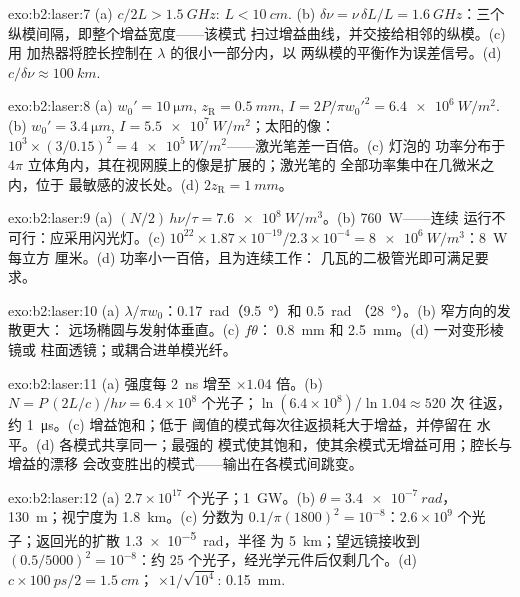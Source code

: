 \begin{solution}{exo:b2:laser:7}
(a) $c/2L > \qty{1.5}{GHz}$: $L < \qty{10}{cm}$. (b) $\delta\nu = \nu\,\delta L/L
= \qty{1.6}{GHz}$：三个纵模间隔，即整个增益宽度——该模式
扫过增益曲线，并交接给相邻的纵模。(c) 用
加热器将腔长控制在 $\lambda$ 的很小一部分内，以
两纵模的平衡作为误差信号。(d) $c/\delta\nu \approx
\qty{100}{km}$.
\end{solution}

\begin{solution}{exo:b2:laser:8}
(a) $w_0' = \qty{10}{\micro m}$, $z_{\text{R}} = \qty{0.5}{mm}$, $I = 2P/\pi
w_0'^2 = \qty{6.4e6}{W/m^2}$. (b) $w_0' = \qty{3.4}{\micro m}$, $I =
\qty{5.5e7}{W/m^2}$；太阳的像：$10^3 \times (3/0.15)^2 =
\qty{4e5}{W/m^2}$——激光笔差一百倍。(c) 灯泡的
功率分布于 $4\pi$ 立体角内，其在视网膜上的像是扩展的；激光笔的
全部功率集中在几微米之内，位于
最敏感的波长处。(d) $2z_{\text{R}} = \qty{1}{mm}$。
\end{solution}

\begin{solution}{exo:b2:laser:9}
(a) $(N/2)\,h\nu/\tau = \qty{7.6e8}{W/m^3}$。(b) \qty{760}{W}——连续
运行不可行：应采用闪光灯。(c) $10^{22} \times 1.87 \times
10^{-19}/2.3 \times 10^{-4} = \qty{8e6}{W/m^3}$：\qty{8}{W} 每立方
厘米。(d) 功率小一百倍，且为连续工作：
几瓦的二极管光即可满足要求。
\end{solution}

\begin{solution}{exo:b2:laser:10}
(a) $\lambda/\pi w_0$：\qty{0.17}{rad}（\qty{9.5}{\degree}）和 \qty{0.5}{rad}
（\qty{28}{\degree}）。(b) 窄方向的发散更大：
远场椭圆与发射体垂直。(c) $f\theta$：
\qty{0.8}{mm} 和 \qty{2.5}{mm}。(d) 一对变形棱镜或
柱面透镜；或耦合进单模光纤。
\end{solution}

\begin{solution}{exo:b2:laser:11}
(a) 强度每 \qty{2}{ns} 增至 $\times 1.04$ 倍。(b) $N = P\,(2L/c)/h\nu =
6.4 \times 10^8$ 个光子；$\ln(6.4 \times 10^8)/\ln 1.04 \approx 520$ 次
往返，约 \qty{1}{\micro s}。(c) 增益饱和；低于
阈值的模式每次往返损耗大于增益，并停留在
水平。(d) 各模式共享同一；最强的
模式使其饱和，使其余模式无增益可用；腔长与增益的漂移
会改变胜出的模式——输出在各模式间跳变。
\end{solution}

\begin{solution}{exo:b2:laser:12}
(a) $2.7 \times 10^{17}$ 个光子；\qty{1}{GW}。(b) $\theta = \qty{3.4e-7}{rad}$，
\qty{130}{m}；视宁度为 \qty{1.8}{km}。(c) 分数为 $0.1/\pi(1800)^2 =
10^{-8}$：$2.6 \times 10^9$ 个光子；返回光的扩散 \qty{1.3e-5}{rad}，半径
为 \qty{5}{km}；望远镜接收到 $(0.5/5000)^2 = 10^{-8}$：约 $25$
个光子，经光学元件后仅剩几个。(d) $c \times \qty{100}{ps}/2 = \qty{1.5}{cm}$；
$\times 1/\sqrt{10^4}$: \qty{0.15}{mm}.
\end{solution}

